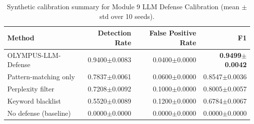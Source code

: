 \begin{table}[h]
\centering
\caption{Synthetic calibration summary for Module 9 LLM Defense Calibration (mean $\pm$ std over 10 seeds).}
\label{tab:module9_llm_defense}
\begin{tabular}{lrrr}
\toprule
Method & Detection Rate & False Positive Rate & F1 \\
\midrule
OLYMPUS-LLM-Defense & 0.9400$\pm$0.0083 & 0.0400$\pm$0.0000 & \textbf{0.9499$\pm$0.0042} \\
Pattern-matching only & 0.7837$\pm$0.0061 & 0.0600$\pm$0.0000 & 0.8547$\pm$0.0036 \\
Perplexity filter & 0.7208$\pm$0.0092 & 0.1000$\pm$0.0000 & 0.8005$\pm$0.0057 \\
Keyword blacklist & 0.5520$\pm$0.0089 & 0.1200$\pm$0.0000 & 0.6784$\pm$0.0067 \\
No defense (baseline) & 0.0000$\pm$0.0000 & 0.0000$\pm$0.0000 & 0.0000$\pm$0.0000 \\
\bottomrule
\end{tabular}
\end{table}